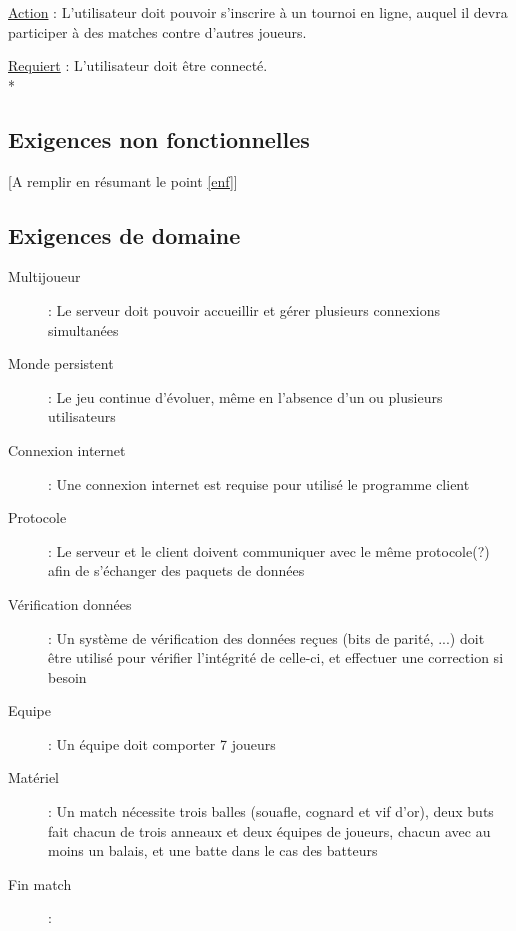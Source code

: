 \documentclass[a4paper]{article}
\begin{document}
\begin{description}[style=nextline]
			\item[Jouer dans un tournois :]
			\begin{description}[leftmargin=*] %
				\item[]
				\item \underline{Action} : L'utilisateur doit pouvoir s'inscrire à un tournoi en ligne, auquel il devra participer à des matches contre d'autres joueurs.
				\item \underline{Requiert} : L'utilisateur doit être connecté.\\*
			\end{description} %
			
		\end{description}

\subsection{Exigences non fonctionnelles}
[A remplir en résumant le point \ref{enf}]

\subsection{Exigences de domaine}
\begin{description}
	\item[Multijoueur] : Le serveur doit pouvoir accueillir et gérer plusieurs connexions simultanées
	\item[Monde persistent] : Le jeu continue d'évoluer, même en l'absence d'un ou plusieurs utilisateurs
	\item[Connexion internet] : Une connexion internet est requise pour utilisé le programme client
	\item[Protocole] : Le serveur et le client doivent communiquer avec le même protocole(?) afin de s'échanger des paquets de données
	\item[Vérification données] : Un système de vérification des données reçues (bits de parité, ...) doit être utilisé pour vérifier l'intégrité de celle-ci, et effectuer une correction si besoin
	\item[Equipe] : Un équipe doit comporter 7 joueurs
	\item[Matériel] : Un match nécessite trois balles (souafle, cognard et vif d'or), deux buts fait chacun de trois anneaux et deux équipes de joueurs, chacun avec au moins un balais, et une batte dans le cas des batteurs
	\item[Fin match] : 
\end{description}
\end{document}
